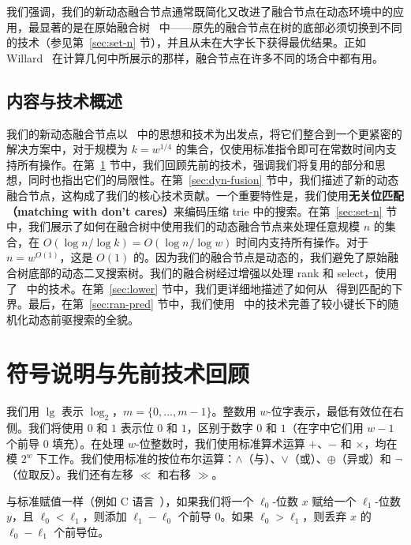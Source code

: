 \documentclass[11pt,a4paper]{ctexart}
\newcommand{\tto}{\text{0}}
\newcommand{\ttl}{\text{1}}
\newcommand{\AND}{\land}
\newcommand{\OR}{\lor}
\newcommand{\XOR}{\oplus}
\newcommand{\NOT}{\lnot}
\newcommand{\LSHIFT}{\ll}
\newcommand{\RSHIFT}{\gg}
\begin{document}
我们强调，我们的新动态融合节点通常既简化又改进了融合节点在动态环境中的应用，最显著的是在原始融合树~\cite{fredman93fusion} 中——原先的融合节点在树的底部必须切换到不同的技术（参见第~\ref{sec:set-n} 节），并且从未在大字长下获得最优结果。正如 Willard~\cite{willard92fusion} 在计算几何中所展示的那样，融合节点在许多不同的场合中都有用。

\subsection{内容与技术概述}

我们的新动态融合节点以~\cite{ajtai84hashing,fredman93fusion} 中的思想和技术为出发点，将它们整合到一个更紧密的解决方案中，对于规模为 $k = w^{1/4}$ 的集合，仅使用标准指令即可在常数时间内支持所有操作。在第~\ref{sec:prelim} 节中，我们回顾先前的技术，强调我们将复用的部分和思想，同时也指出它们的局限性。在第~\ref{sec:dyn-fusion} 节中，我们描述了新的动态融合节点，这构成了我们的核心技术贡献。一个重要特性是，我们使用\textbf{无关位匹配（matching with don't cares）}来编码压缩 trie 中的搜索。在第~\ref{sec:set-n} 节中，我们展示了如何在融合树中使用我们的动态融合节点来处理任意规模 $n$ 的集合，在 $O(\log n/\log k) = O(\log n/\log w)$ 时间内支持所有操作。对于 $n = w^{O(1)}$，这是 $O(1)$ 的。因为我们的融合节点是动态的，我们避免了原始融合树底部的动态二叉搜索树。我们的融合树经过增强以处理 rank 和 select，使用了~\cite{dietz89sums,patrascu04connect} 中的技术。在第~\ref{sec:lower} 节中，我们更详细地描述了如何从~\cite{fredman89cellprobe,beame02pred} 得到匹配的下界。最后，在第~\ref{sec:ran-pred} 节中，我们使用~\cite{patrascu06pred} 中的技术完善了较小键长下的随机化动态前驱搜索的全貌。

\section{符号说明与先前技术回顾}\label{sec:prelim}

我们用 $\lg$ 表示 $\log_2$，$m = \{0, \dots, m-1\}$。整数用 $w$-位字表示，最低有效位在右侧。我们将使用 $\tto$ 和 $\ttl$ 表示位 $0$ 和 $1$，区别于数字 $0$ 和 $1$（在字中它们用 $w-1$ 个前导 $\tto$ 填充）。在处理 $w$-位整数时，我们使用标准算术运算 $+$、$-$ 和 $\times$，均在模 $2^w$ 下工作。我们使用标准的按位布尔运算：$\AND$（与）、$\OR$（或）、$\XOR$（异或）和 $\NOT$（位取反）。我们还有左移 $\LSHIFT$ 和右移 $\RSHIFT$。

与标准赋值一样（例如 C 语言~\cite{KR78}），如果我们将一个 $\ell_0$-位数 $x$ 赋给一个 $\ell_1$-位数 $y$，且 $\ell_0 < \ell_1$，则添加 $\ell_1 - \ell_0$ 个前导 $\tto$。如果 $\ell_0 > \ell_1$，则丢弃 $x$ 的 $\ell_0 - \ell_1$ 个前导位。
\end{document}
